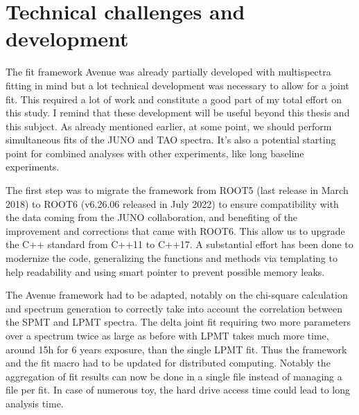 \documentclass[../main.tex]{subfiles}
\begin{document}
%

%
%
%
\section{Technical challenges and development}
\label{sec:joint_fit:tech}

The fit framework Avenue was already partially developed with multispectra fitting in mind but a lot technical development was necessary to allow for a joint fit. This required a lot of work and constitute a good part of my total effort on this study. I remind that these development will be useful beyond this thesis and this subject. As already mentioned earlier, at some point, we should perform simultaneous fits of the JUNO and TAO spectra. It's also a potential starting  point for combined analyses with other experiments, like long baseline experiments.

The first step was to migrate the framework from ROOT5 (last release in March 2018) to ROOT6 (v6.26.06 released in July 2022) to ensure compatibility with the data coming from the JUNO collaboration, and benefiting of the improvement and corrections that came with ROOT6. This allow us to upgrade the C++ standard from C++11 to C++17. A substantial effort has been done to modernize the code, generalizing the functions and methods via templating to help readability and using smart pointer to prevent possible memory leaks.

The Avenue framework had to be adapted, notably on the chi-square calculation and spectrum generation to correctly take into account the correlation between the SPMT and LPMT spectra. The delta joint fit requiring two more parameters over a spectrum twice as large as before with LPMT takes much more time, around 15h for 6 years exposure, than the single LPMT fit. Thus the framework and the fit macro had to be updated for distributed computing. Notably the aggregation of fit results can now be done in a single file instead of managing a file per fit. In case of numerous toy, the hard drive access time could lead to long analysis time.
\end{document}
